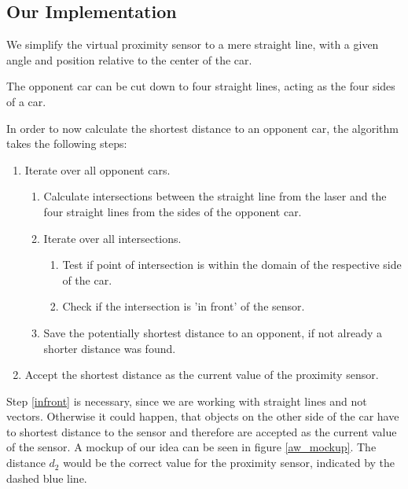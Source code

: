 \documentclass[paper=a4, fontsize=11pt]{scrreprt}
\begin{document}
\subsection{Our Implementation}
We simplify the virtual proximity sensor to a mere straight line,
with a given angle and position relative to the center of the car.

The opponent car can be cut down to four straight lines,
acting as the four sides of a car.

In order to now calculate the shortest distance to an opponent car,
the algorithm takes the following steps:

\begin{enumerate}
  \item Iterate over all opponent cars.
  \begin{enumerate}
    \item Calculate intersections between the straight line from the laser
    and the four straight lines from the sides of the opponent car.
    \item Iterate over all intersections.
    \begin{enumerate}
      \item Test if point of intersection is within the domain of the respective side of the car.
      \item\label{infront} Check if the intersection is 'in front' of the sensor.
    \end{enumerate}
    \item Save the potentially shortest distance to an opponent, if not already a shorter distance was found.
  \end{enumerate}
  \item Accept the shortest distance as the current value of the proximity sensor.
\end{enumerate}

Step \ref{infront} is necessary, since we are working with straight lines
and not vectors. Otherwise it could happen,
that objects on the other side of the car have to shortest distance to the sensor
and therefore are accepted as the current value of the sensor.
A mockup of our idea can be seen in figure \ref{aw_mockup}.
The distance $d_2$ would be the correct value for the proximity sensor,
indicated by the dashed blue line.
\end{document}
